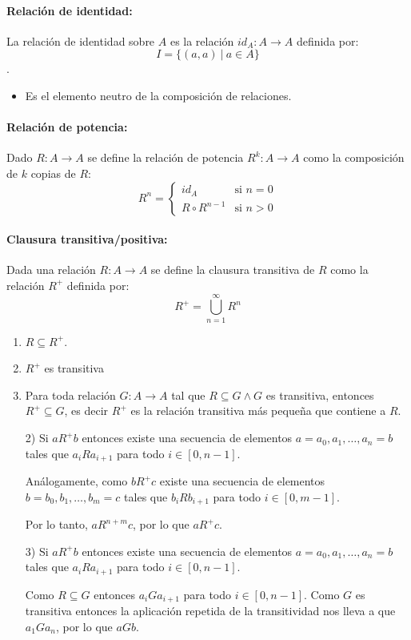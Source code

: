 \paragraph{Relación de identidad:} La relación de identidad sobre \(A\) es la relación \(id_A:A\to A\) definida por: \[I = \{(a,a)~|~a\in A\}\].
\begin{itemize}
  \item Es el elemento neutro de la composición de relaciones.
\end{itemize}

\paragraph{Relación de potencia:} Dado \(R: A\to A\) se define la relación de potencia \(R^k: A\to A\) como la composición de \(k\) copias de \(R\):
\[R^n = \left\{
  \begin{array}{ll}
    id_A           & \text{si } n = 0 \\
    R\circ R^{n-1} & \text{si } n > 0
  \end{array}
  \right.
\]

\paragraph{Clausura transitiva/positiva:} Dada una relación \(R:A\to A\) se define la clausura transitiva de \(R\) como la relación \(R^+\) definida por: \[R^+ = \bigcup_{n=1}^\infty R^n\]
\begin{enumerate}
  \item \(R\subseteq R^+\).
  \item \(R^+\) es transitiva
  \item Para toda relación \(G:A\to A\) tal que \(R\subseteq G \land G\) es transitiva, entonces \(R^+\subseteq G\), es decir \(R^+\) es la relación transitiva más pequeña que contiene a \(R\).
\end{enumerate}
\begin{demo}
  \begin{enumerate}
    \item[2)] Si \(a R^+ b\) entonces existe una secuencia de elementos \(a = a_0, a_1, \dots, a_n = b\) tales que \(a_i R a_{i+1}\) para todo \(i\in [0,n-1]\).

      Análogamente, como \(b R^+ c\) existe una secuencia de elementos \(b = b_0, b_1, \dots, b_m = c\) tales que \(b_i R b_{i+1}\) para todo \(i\in [0,m-1]\).

      Por lo tanto, \(a R^{n+m} c\), por lo que \(a R^+ c\).
    \item[3)] Si \(a R^+ b\) entonces existe una secuencia de elementos \(a = a_0, a_1, \dots, a_n = b\) tales que \(a_i R a_{i+1}\) para todo \(i\in [0,n-1]\).

      Como \(R\subseteq G\) entonces \(a_i G a_{i+1}\) para todo \(i\in [0,n-1]\). Como \(G\) es transitiva entonces la aplicación repetida de la transitividad nos lleva a que \(a_1 G a_n\), por lo que \(a G b\).
  \end{enumerate}
\end{demo}


